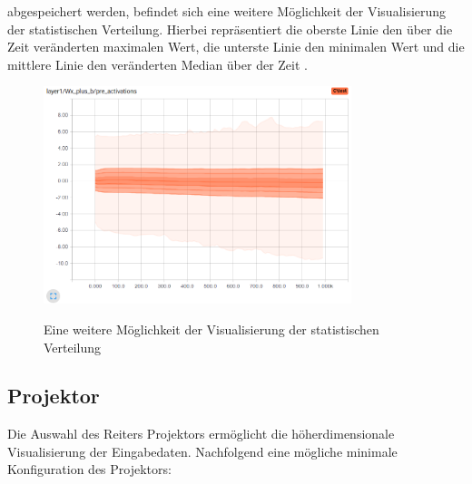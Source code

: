 abgespeichert werden, befindet sich eine weitere Möglichkeit der Visualisierung der statistischen Verteilung. Hierbei repräsentiert die oberste Linie den über die Zeit veränderten maximalen Wert, die unterste Linie den minimalen Wert und die mittlere Linie den veränderten Median über der Zeit \cite{tensorboard.2017}.

\vspace{0.4cm}
\begin{figure}[h!]
	\centering
	 \includegraphics[width=0.8\textwidth]{images/Kapitel_3/distribution.png}\\
	\vspace{10pt} 
	\caption[Eine weitere Möglichkeit der Visualisierung der statistischen Verteilung]{Eine weitere Möglichkeit der Visualisierung der statistischen Verteilung}
	\label{fig:verteilung}
\end{figure}




\subsection{Projektor}


Die Auswahl des Reiters Projektors ermöglicht die höherdimensionale Visualisierung der Eingabedaten. Nachfolgend eine mögliche minimale Konfiguration des Projektors:
\vspace{0.1cm}
\\

